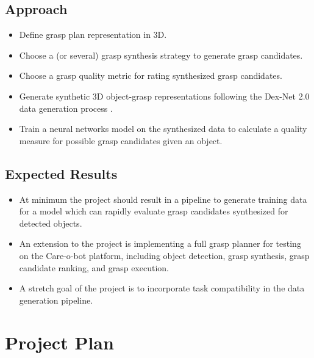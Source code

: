 \documentclass[12pt]{article}
\begin{document}
    \subsection{Approach}
    \begin{itemize}
        \item Define grasp plan representation in 3D.
        \item Choose a (or several) grasp synthesis strategy to generate grasp candidates.
        \item Choose a grasp quality metric for rating synthesized grasp candidates.
        \item Generate synthetic 3D object-grasp representations following the Dex-Net 2.0 data generation process \cite{mahler2017}.
        \item Train a neural networks model on the synthesized data to calculate a quality measure for possible grasp candidates given an object.
    \end{itemize}

    \subsection{Expected Results}
    \begin{itemize}
    	\item At minimum the project should result in a pipeline to generate training data for a model which can rapidly evaluate grasp candidates synthesized for detected objects.
    	\item An extension to the project is implementing a full grasp planner for testing on the Care-o-bot platform, including object detection, grasp synthesis, grasp candidate ranking, and grasp execution.
    	\item A stretch goal of the project is to incorporate task compatibility in the data generation pipeline.
    \end{itemize}


\section{Project Plan}

\end{document}

